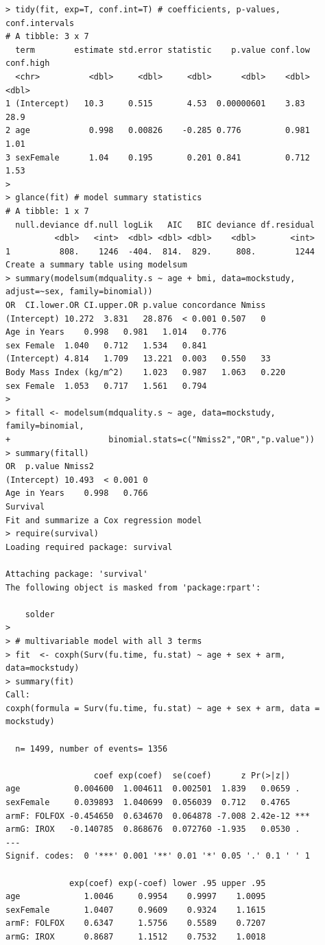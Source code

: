 \documentclass[
]{book}
\begin{document}
\begin{verbatim}
> tidy(fit, exp=T, conf.int=T) # coefficients, p-values, conf.intervals
# A tibble: 3 x 7
  term        estimate std.error statistic    p.value conf.low conf.high
  <chr>          <dbl>     <dbl>     <dbl>      <dbl>    <dbl>     <dbl>
1 (Intercept)   10.3     0.515       4.53  0.00000601    3.83      28.9 
2 age            0.998   0.00826    -0.285 0.776         0.981      1.01
3 sexFemale      1.04    0.195       0.201 0.841         0.712      1.53
> 
> glance(fit) # model summary statistics
# A tibble: 1 x 7
  null.deviance df.null logLik   AIC   BIC deviance df.residual
          <dbl>   <int>  <dbl> <dbl> <dbl>    <dbl>       <int>
1          808.    1246  -404.  814.  829.     808.        1244
Create a summary table using modelsum
> summary(modelsum(mdquality.s ~ age + bmi, data=mockstudy, adjust=~sex, family=binomial))
OR  CI.lower.OR CI.upper.OR p.value concordance Nmiss
(Intercept) 10.272  3.831   28.876  < 0.001 0.507   0
Age in Years    0.998   0.981   1.014   0.776       
sex Female  1.040   0.712   1.534   0.841       
(Intercept) 4.814   1.709   13.221  0.003   0.550   33
Body Mass Index (kg/m^2)    1.023   0.987   1.063   0.220       
sex Female  1.053   0.717   1.561   0.794       
> 
> fitall <- modelsum(mdquality.s ~ age, data=mockstudy, family=binomial,
+                    binomial.stats=c("Nmiss2","OR","p.value"))
> summary(fitall)
OR  p.value Nmiss2
(Intercept) 10.493  < 0.001 0
Age in Years    0.998   0.766   
Survival
Fit and summarize a Cox regression model
> require(survival)
Loading required package: survival

Attaching package: 'survival'
The following object is masked from 'package:rpart':

    solder
> 
> # multivariable model with all 3 terms
> fit  <- coxph(Surv(fu.time, fu.stat) ~ age + sex + arm, data=mockstudy)
> summary(fit)
Call:
coxph(formula = Surv(fu.time, fu.stat) ~ age + sex + arm, data = mockstudy)

  n= 1499, number of events= 1356 

                  coef exp(coef)  se(coef)      z Pr(>|z|)    
age           0.004600  1.004611  0.002501  1.839   0.0659 .  
sexFemale     0.039893  1.040699  0.056039  0.712   0.4765    
armF: FOLFOX -0.454650  0.634670  0.064878 -7.008 2.42e-12 ***
armG: IROX   -0.140785  0.868676  0.072760 -1.935   0.0530 .  
---
Signif. codes:  0 '***' 0.001 '**' 0.01 '*' 0.05 '.' 0.1 ' ' 1

             exp(coef) exp(-coef) lower .95 upper .95
age             1.0046     0.9954    0.9997    1.0095
sexFemale       1.0407     0.9609    0.9324    1.1615
armF: FOLFOX    0.6347     1.5756    0.5589    0.7207
armG: IROX      0.8687     1.1512    0.7532    1.0018


\end{verbatim}
\end{document}
